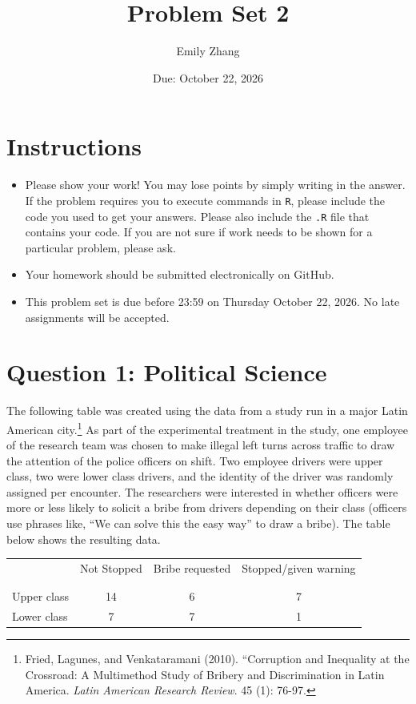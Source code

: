 \documentclass[12pt,letterpaper]{article}
\title{Problem Set 2}
\date{Due: October 22, 2026}
\author{Emily Zhang}
\begin{document}
	\maketitle
	\section*{Instructions}
\begin{itemize}
	\item Please show your work! You may lose points by simply writing in the answer. If the problem requires you to execute commands in \texttt{R}, please include the code you used to get your answers. Please also include the \texttt{.R} file that contains your code. If you are not sure if work needs to be shown for a particular problem, please ask.
	\item Your homework should be submitted electronically on GitHub.
	\item This problem set is due before 23:59 on Thursday October 22, 2026. No late assignments will be accepted.

\end{itemize}

	
	\vspace{.5cm}
	\section*{Question 1: Political Science}
		\vspace{.25cm}
	The following table was created using the data from a study run in a major Latin American city.\footnote{Fried, Lagunes, and Venkataramani (2010). ``Corruption and Inequality at the Crossroad: A Multimethod Study of Bribery and Discrimination in Latin America. \textit{Latin American Research Review}. 45 (1): 76-97.} As part of the experimental treatment in the study, one employee of the research team was chosen to make illegal left turns across traffic to draw the attention of the police officers on shift. Two employee drivers were upper class, two were lower class drivers, and the identity of the driver was randomly assigned per encounter. The researchers were interested in whether officers were more or less likely to solicit a bribe from drivers depending on their class (officers use phrases like, ``We can solve this the easy way'' to draw a bribe). The table below shows the resulting data.


\begin{table}[h!]
	\centering
	\begin{tabular}{l | c c c }
		& Not Stopped & Bribe requested & Stopped/given warning \\
		\\[-1.8ex] 
		\hline \\[-1.8ex]
		Upper class & 14 & 6 & 7 \\
		Lower class & 7 & 7 & 1 \\
		\hline
	\end{tabular}
\end{table}
\end{document}
